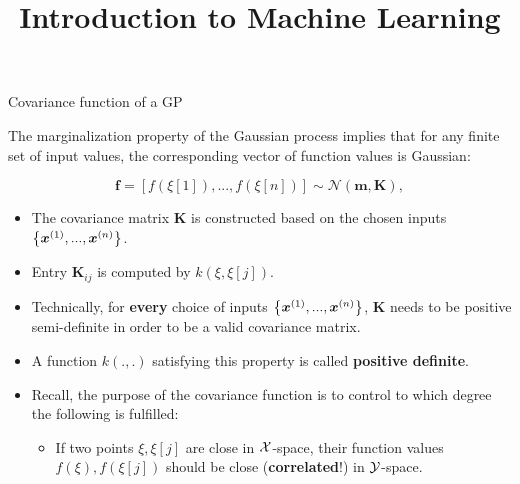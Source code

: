 




\newcommand{\titlefigure}{figure_man/covariance2D-2.png}
\newcommand{\learninggoals}{
  \item \textcolor{blue}{XXX}
  \item \textcolor{blue}{XXX}
}

\title{Introduction to Machine Learning}
\date{}




\begin{vbframe}{Covariance function of a GP}

  The marginalization property of the Gaussian process implies that for any finite set of input values, the corresponding vector of function values is Gaussian:

  $$
    \bm{f} = \left[f\left(\xi[1]\right), ..., f\left(\xi[n]\right)\right] \sim \mathcal{N}\left(\bm{m}, \bm{K}\right),
  $$ 


\begin{itemize}
  \item The covariance matrix $\bm{K}$ is constructed based on the chosen inputs $\left\{\bm{x}^{(1)}, ..., \bm{x}^{(n)}\right\}$.
  \item Entry $\bm{K}_{ij}$ is computed by $k\left(\xi, \xi[j]\right)$.
  \item Technically, for \textbf{every} choice of inputs $\left\{\bm{x}^{(1)}, ..., \bm{x}^{(n)}\right\}$, $\bm{K}$ needs to be positive semi-definite in order to be a valid covariance matrix.
  \item A function $k(.,.)$ satisfying this property is called \textbf{positive definite}.

\framebreak 

  \item Recall, the purpose of the covariance function is to control to which degree the following is fulfilled: \vspace*{0.4cm}
  \begin{itemize}
    \item[] If two points $\xi, \xi[j]$ are close in $\mathcal{X}$-space, their function values $f(\xi), f(\xi[j])$ should be close (\textbf{correlated}!) in $\mathcal{Y}$-space.
  \end{itemize} \vspace*{0.4cm}


\end{itemize}
\end{vbframe}

